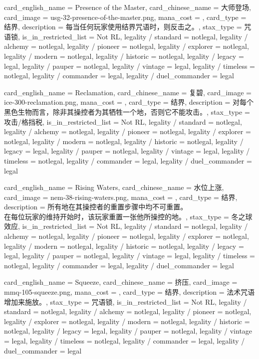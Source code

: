 \documentclass[lang = cn, color = black, 10pt]{AllThatStax}
\begin{document}
\card
{
	card_english_name = {Presence of the Master},
	card_chinese_name = {大师登场},
	card_image = usg-32-presence-of-the-master.png,
	mana_cost = ,
	card_type = 结界,
	description = {每当任何玩家使用结界咒语时，则反击之。},
	stax_type = 咒语锁,
	is_in_restricted_list = Not RL,
	legality / standard = notlegal,
	legality / alchemy = notlegal,
	legality / pioneer = notlegal,
	legality / explorer = notlegal,
	legality / modern = notlegal,
	legality / historic = notlegal,
	legality / legacy = legal,
	legality / pauper = notlegal,
	legality / vintage = legal,
	legality / timeless = notlegal,
	legality / commander = legal,
	legality / duel_commander = legal
}

\card
{
	card_english_name = {Reclamation},
	card_chinese_name = {复碧},
	card_image = ice-300-reclamation.png,
	mana_cost = ,
	card_type = 结界,
	description = {对每个黑色生物而言，除非其操控者为其牺牲一个地，否则它不能攻击。},
	stax_type = 攻击/格挡税,
	is_in_restricted_list = Not RL,
	legality / standard = notlegal,
	legality / alchemy = notlegal,
	legality / pioneer = notlegal,
	legality / explorer = notlegal,
	legality / modern = notlegal,
	legality / historic = notlegal,
	legality / legacy = legal,
	legality / pauper = notlegal,
	legality / vintage = legal,
	legality / timeless = notlegal,
	legality / commander = legal,
	legality / duel_commander = legal
}

\card
{
	card_english_name = {Rising Waters},
	card_chinese_name = {水位上涨},
	card_image = nem-38-rising-waters.png,
	mana_cost = ,
	card_type = 结界,
	description = {所有地在其操控者的重置步骤中均不可重置。\\
在每位玩家的维持开始时，该玩家重置一张他所操控的地。},
	stax_type = 冬之球效应,
	is_in_restricted_list = Not RL,
	legality / standard = notlegal,
	legality / alchemy = notlegal,
	legality / pioneer = notlegal,
	legality / explorer = notlegal,
	legality / modern = notlegal,
	legality / historic = notlegal,
	legality / legacy = legal,
	legality / pauper = notlegal,
	legality / vintage = legal,
	legality / timeless = notlegal,
	legality / commander = legal,
	legality / duel_commander = legal
}

\card
{
	card_english_name = {Squeeze},
	card_chinese_name = {挤压},
	card_image = mmq-105-squeeze.png,
	mana_cost = ,
	card_type = 结界,
	description = {法术咒语增加来施放。},
	stax_type = 咒语锁,
	is_in_restricted_list = Not RL,
	legality / standard = notlegal,
	legality / alchemy = notlegal,
	legality / pioneer = notlegal,
	legality / explorer = notlegal,
	legality / modern = notlegal,
	legality / historic = notlegal,
	legality / legacy = legal,
	legality / pauper = notlegal,
	legality / vintage = legal,
	legality / timeless = notlegal,
	legality / commander = legal,
	legality / duel_commander = legal
}
\end{document}
